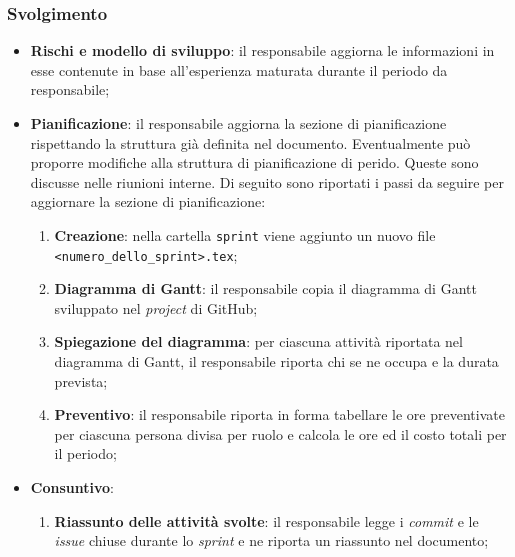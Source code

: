 \subsubsection{Svolgimento}
\begin{itemize}
	\item \textbf{Rischi e modello di sviluppo}: il responsabile aggiorna
	      le informazioni in esse contenute in base all'esperienza maturata
	      durante il periodo da responsabile;

	\item \textbf{Pianificazione}: il responsabile aggiorna la sezione di
	      pianificazione rispettando la struttura già definita nel documento.
	      Eventualmente può proporre modifiche alla struttura di pianificazione
	      di perido. Queste sono discusse nelle riunioni interne.
	      Di seguito sono riportati i passi da seguire per aggiornare la sezione
	      di pianificazione:
	      \begin{enumerate}
		      \item \textbf{Creazione}: nella cartella \texttt{sprint} viene
		            aggiunto un nuovo file \\ \texttt{<numero\_dello\_sprint>.tex};

		      \item \textbf{Diagramma di Gantt}: il responsabile copia il
		            diagramma di Gantt sviluppato nel \textit{project} di
		            GitHub\g;

		      \item \textbf{Spiegazione del diagramma}: per ciascuna attività
		            riportata nel diagramma di Gantt, il responsabile riporta
		            chi se ne occupa e la durata prevista;

		      \item \textbf{Preventivo}: il responsabile riporta in forma
		            tabellare le ore preventivate per ciascuna persona divisa
		            per ruolo e calcola le ore ed il costo totali per il
		            periodo;
	      \end{enumerate}

	\item \textbf{Consuntivo}:
	      \begin{enumerate}
		      \item \textbf{Riassunto delle attività svolte}: il responsabile
		            legge i \textit{commit} e le \textit{issue\g} chiuse durante
		            lo \textit{sprint} e ne riporta un riassunto nel documento;


\end{enumerate}
\end{itemize}
